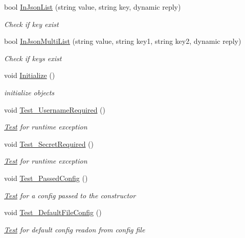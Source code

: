 \begin{DoxyCompactItemize}
bool \hyperlink{class_h_d3_1_1_test_1_1_h_d3_test_a77c6722566bd70ee46d12fd22756aec6}{In\+Json\+List} (string value, string key, dynamic reply)
\begin{DoxyCompactList}\small\item\em Check if key exist \end{DoxyCompactList}\item 
bool \hyperlink{class_h_d3_1_1_test_1_1_h_d3_test_a6eae39cd21567d860b1d3dab57c7c009}{In\+Json\+Multi\+List} (string value, string key1, string key2, dynamic reply)
\begin{DoxyCompactList}\small\item\em Check if keys exist \end{DoxyCompactList}\item 
void \hyperlink{class_h_d3_1_1_test_1_1_h_d3_test_ae9e28970c4958a3e32fcb32f8138c450}{Initialize} ()
\begin{DoxyCompactList}\small\item\em initialize objects \end{DoxyCompactList}\item 
void \hyperlink{class_h_d3_1_1_test_1_1_h_d3_test_acd440d651771abea6c4f7bec066b8fc9}{Test\+\_\+\+Username\+Required} ()
\begin{DoxyCompactList}\small\item\em \hyperlink{namespace_h_d3_1_1_test}{Test} for runtime exception \end{DoxyCompactList}\item 
void \hyperlink{class_h_d3_1_1_test_1_1_h_d3_test_a6e43154f24d0068475a0dccdd27ed0b1}{Test\+\_\+\+Secret\+Required} ()
\begin{DoxyCompactList}\small\item\em \hyperlink{namespace_h_d3_1_1_test}{Test} for runtime exception \end{DoxyCompactList}\item 
void \hyperlink{class_h_d3_1_1_test_1_1_h_d3_test_a6164a00d42c805f748af17e88cde7f96}{Test\+\_\+\+Passed\+Config} ()
\begin{DoxyCompactList}\small\item\em \hyperlink{namespace_h_d3_1_1_test}{Test} for a config passed to the constructor \end{DoxyCompactList}\item 
void \hyperlink{class_h_d3_1_1_test_1_1_h_d3_test_a5c2635c61ef62aef235f1c3013b5118a}{Test\+\_\+\+Default\+File\+Config} ()
\begin{DoxyCompactList}\small\item\em \hyperlink{namespace_h_d3_1_1_test}{Test} for default config readon from config file \end{DoxyCompactList}\item 

\end{DoxyCompactItemize}
